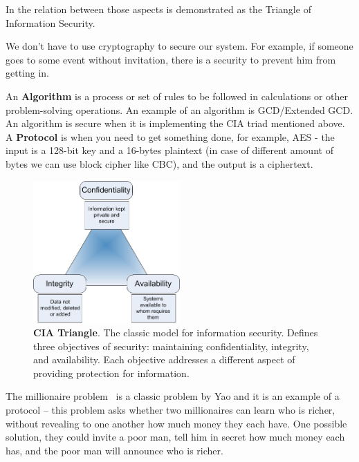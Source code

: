In  the relation between those aspects is demonstrated as the
Triangle of Information Security.

We don't have to use cryptography to secure our system. For example, if someone
goes to some event without invitation, there is a security to prevent him from
getting in.

An \textbf{Algorithm} is a process or set of rules to be followed in
calculations or other problem-solving operations. An example of an algorithm is
GCD/Extended GCD. An algorithm is secure when it is implementing the CIA triad
mentioned above. A \textbf{Protocol} is when you need to get something done, for
example, AES -  the input is a 128-bit key and a 16-bytes plaintext (in case of
different amount of bytes we can use block cipher like CBC), and the output is a ciphertext.

\begin{figure}
    \centering
    \includegraphics[width=0.5\textwidth]{images/ch1_Intro/cia.jpg}
    \caption{\textbf{CIA Triangle}. The classic model for information security. Defines three objectives of security: maintaining confidentiality, integrity, and availability. Each objective addresses a different aspect of providing protection for information.}
    \label{fig:CIA}
\end{figure}

The millionaire problem~\cite{lin2005efficient} is a classic problem by Yao and
it is an example of a protocol – this problem asks whether two millionaires can
learn who is richer, without revealing to one another how much money they each
have. One possible solution, they could invite a poor man, tell him in secret
how much money each has, and the poor man will announce who is richer.  

